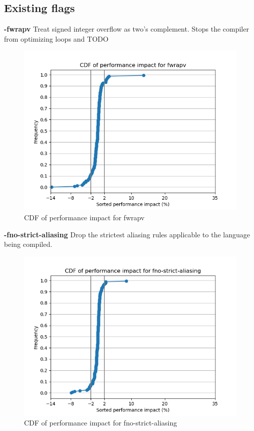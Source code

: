 \documentclass{sciposter}
\begin{document}
\begin{multicols}{3}
\subsection{Existing flags}
\textbf{-fwrapv} Treat signed integer overflow as two's complement. Stops the compiler
from optimizing loops and TODO \\
\begin{figure}[h!]
\centering
\includegraphics[scale=1.2]{fwrapv}
\caption{CDF of performance impact for fwrapv}
\end{figure}

\textbf{-fno-strict-aliasing} Drop the strictest aliasing rules applicable to
the language being compiled. \\
\begin{figure}[h!]
\centering
\includegraphics[scale=1.2]{fno-strict-aliasing}
\caption{CDF of performance impact for fno-strict-aliasing}
\end{figure}


\end{multicols}
\end{document}
